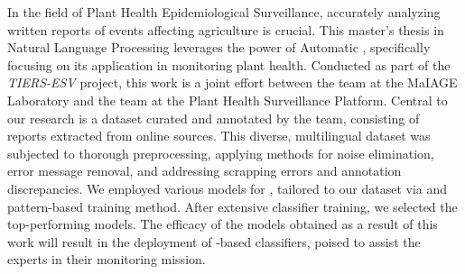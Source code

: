 In the field of Plant Health Epidemiological Surveillance, accurately analyzing written reports of events affecting agriculture is crucial. This master's thesis in Natural Language Processing leverages the power of Automatic \textclassification{}, specifically focusing on its application in monitoring plant health. Conducted as part of the \emph{TIERS-ESV} project, this work is a joint effort between the \bibliome{} team at the \INRAE{} MaIAGE Laboratory and the \VSI{} team at the \PESV{} Plant Health Surveillance Platform. 
Central to our research is a dataset curated and annotated by the \VSI{} team, consisting of reports extracted from online sources.
This diverse, multilingual dataset was subjected to thorough preprocessing, applying methods for noise elimination, error message removal, and addressing scrapping errors and annotation discrepancies.
We employed various \BERT{} models for \textclassification{}, tailored to our dataset via \finetuning{} and pattern-based training method.
After extensive classifier training, we selected the top-performing models. 
The efficacy of the models obtained as a result of this work will result in the deployment of \BERT{}-based classifiers, poised to assist the \VSI{} experts in their monitoring mission.
